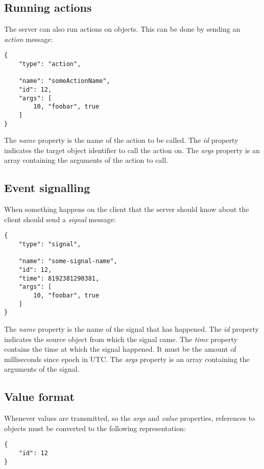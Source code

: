 \documentclass[11pt,a4paper]{article}
\begin{document}
\subsection{Running actions}

The server can also run actions on objects.
This can be done by sending an \textit{action} message:

\begin{verbatim}
{
    "type": "action",

    "name": "someActionName",
    "id": 12,
    "args": [
        10, "foobar", true
    ]
}
\end{verbatim}

The \textit{name} property is the name of the action to be called.
The \textit{id} property indicates the target object identifier to call the action on.
The \textit{args} property is an array containing the arguments of the action to call.

\subsection{Event signalling}

When something happens on the client that the server should know about the client should send a \textit{signal} message:

\begin{verbatim}
{
    "type": "signal",

    "name": "some-signal-name",
    "id": 12,
    "time": 8192381290381,
    "args": [
        10, "foobar", true
    ]
}
\end{verbatim}

The \textit{name} property is the name of the signal that has happened.
The \textit{id} property indicates the source object from which the signal came.
The \textit{time} property contains the time at which the signal happened.
It must be the amount of milliseconds since epoch in UTC.
The \textit{args} property is an array containing the arguments of the signal.

\subsection{Value format}

Whenever values are transmitted, so the \textit{args} and \textit{value} properties, references to objects must be converted to the following representation:

\begin{verbatim}
{
    "id": 12
}
\end{verbatim}
\end{document}
